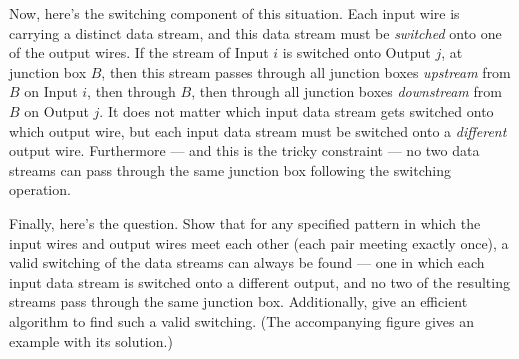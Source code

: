 \documentclass[12pt]{article}
\begin{document}
\begin{enumerate}
Now, here's the switching component of this situation.
Each input wire is carrying a distinct data stream,
and this data stream must be {\em switched} onto one of the output wires.
If the stream of Input $i$ is switched onto Output $j$,
at junction box $B$, then this stream passes through all junction
boxes {\em upstream} from $B$ on Input $i$, then through $B$, then through
all junction boxes {\em downstream} from $B$ on Output $j$.
It does not matter which input data stream gets switched
onto which output wire, but each input data stream must
be switched onto a {\em different} output wire.
Furthermore --- and this is the tricky constraint ---
no two data streams can pass through the same junction box
following the switching operation.


Finally, here's the question.
Show that for any
specified pattern in which the input wires and output wires meet each other
(each pair meeting exactly once),
a valid switching of the data streams can always be found ---
one in which each input data stream is switched onto a different output,
and no two of the resulting streams pass through the same junction box.
Additionally, give an efficient algorithm to find such a valid switching.
(The accompanying figure gives an example with its solution.)

\begin{figure}[h]
\begin{center}


\end{center}
\end{figure}
\end{enumerate}
\end{document}
